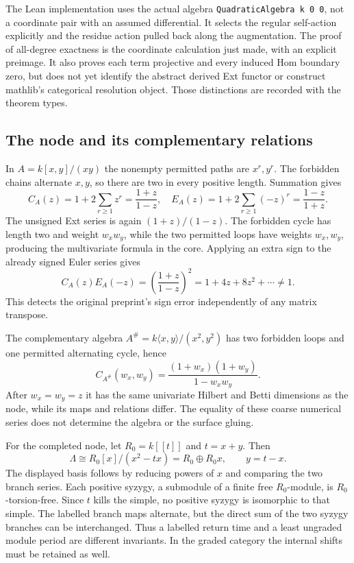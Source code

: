 The Lean implementation uses the actual algebra \texttt{QuadraticAlgebra k 0 0}, not a coordinate pair with an assumed differential. It selects the regular self-action explicitly and the residue action pulled back along the augmentation. The proof of all-degree exactness is the coordinate calculation just made, with an explicit preimage. It also proves each term projective and every induced Hom boundary zero, but does not yet identify the abstract derived Ext functor or construct mathlib's categorical resolution object. Those distinctions are recorded with the theorem types.

\subsection{The node and its complementary relations}
In $A=k[x,y]/(xy)$ the nonempty permitted paths are $x^r,y^r$. The forbidden chains alternate $x,y$, so there are two in every positive length. Summation gives
\[
 C_A(z)=1+2\sum_{r\geq1}z^r=\frac{1+z}{1-z},\quad
 E_A(z)=1+2\sum_{r\geq1}(-z)^r=\frac{1-z}{1+z}.
\]
The unsigned Ext series is again $(1+z)/(1-z)$. The forbidden cycle has length two and weight $w_xw_y$, while the two permitted loops have weights $w_x,w_y$, producing the multivariate formula in the core. Applying an extra sign to the already signed Euler series gives
\[
 C_A(z)E_A(-z)=\left(\frac{1+z}{1-z}\right)^2
             =1+4z+8z^2+\cdots\ne1.
\]
This detects the original preprint's sign error independently of any matrix transpose.

The complementary algebra $A^\#=k\langle x,y\rangle/(x^2,y^2)$ has two forbidden loops and one permitted alternating cycle, hence
\[
 C_{A^\#}(w_x,w_y)=\frac{(1+w_x)(1+w_y)}{1-w_xw_y}.
\]
After $w_x=w_y=z$ it has the same univariate Hilbert and Betti dimensions as the node, while its maps and relations differ. The equality of these coarse numerical series does not determine the algebra or the surface gluing.

For the completed node, let $R_0=k[[t]]$ and $t=x+y$. Then
\[
 \Lambda\cong R_0[x]/(x^2-tx)=R_0\oplus R_0x,
 \qquad y=t-x.
\]
The displayed basis follows by reducing powers of $x$ and comparing the two branch series. Each positive syzygy, a submodule of a finite free $R_0$-module, is $R_0$-torsion-free. Since $t$ kills the simple, no positive syzygy is isomorphic to that simple. The labelled branch maps alternate, but the direct sum of the two syzygy branches can be interchanged. Thus a labelled return time and a least ungraded module period are different invariants. In the graded category the internal shifts must be retained as well.

